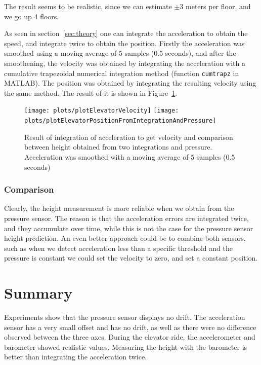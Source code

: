 \documentclass[DIV=14]{scrartcl}
\begin{document}
    The result seems to be realistic, since we can estimate $\pm3$ meters per floor, and we go up 4 floors.

    As seen in section~\ref{sec:theory} one can integrate the acceleration to obtain the speed, and integrate twice to
    obtain the position.
    Firstly the acceleration was smoothed using a moving average of 5 samples (0.5 seconds), and after the smoothening,
    the velocity was obtained by integrating the acceleration with a cumulative trapezoidal numerical
    integration method (function \texttt{cumtrapz} in MATLAB).
    The position was obtained by integrating the resulting velocity using the same method.
    The result of it is shown in Figure~\ref{fig:plotElevatorVelocityAndPosition}.

    \begin{figure}[h]
        \centering
        \texttt{[image: plots/plotElevatorVelocity]}\hfill
        \texttt{[image: plots/plotElevatorPositionFromIntegrationAndPressure]}\hfill
        \caption{Result of integration of acceleration to get velocity and comparison between height obtained from
        two integrations and pressure. Acceleration was smoothed with a moving average of 5 samples (0.5 seconds)}
        \label{fig:plotElevatorVelocityAndPosition}
    \end{figure}

    \subsubsection*{Comparison}
    Clearly, the height measurement is more reliable when we obtain from the pressure sensor.
    The reason is that the acceleration errors are integrated twice, and they accumulate over time, while this is not the
    case for the pressure sensor height prediction.
    An even better approach could be to combine both sensors, such as when we detect acceleration less than a specific
    threshold and the pressure is constant we could set the velocity to zero, and set a constant position.

    \section{Summary}
    Experiments show that the pressure sensor displays no drift.
    The acceleration sensor has a very small offset and has no drift, as well as there were no difference observed
    between the three axes.
    During the elevator ride, the accelerometer and barometer showed realistic values.
    Measuring the height with the barometer is better than integrating the acceleration twice.
\end{document}
